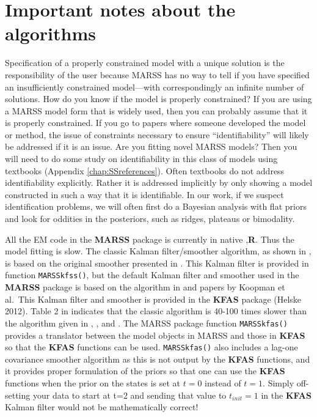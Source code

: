 \documentclass[12pt,]{book}
\begin{document}
\hypertarget{important-notes-about-the-algorithms}{%
\section{Important notes about the algorithms}\label{important-notes-about-the-algorithms}}

Specification of a properly constrained model with a unique solution is the responsibility of the user because MARSS has no way to tell if you have specified an insufficiently constrained model---with correspondingly an infinite number of solutions.
How do you know if the model is properly constrained? If you are using a MARSS model form that is widely used, then you can probably assume that it is properly constrained. If you go to papers where someone developed the model or method, the issue of constraints necessary to ensure ``identifiability'' will likely be addressed if it is an issue. Are you fitting novel MARSS models? Then you will need to do some study on identifiability in this class of models using textbooks (Appendix \ref{chap:SSreferences}). Often textbooks do not address identifiability explicitly. Rather it is addressed implicitly by only showing a model constructed in such a way that it is identifiable. In our work, if we suspect identification problems, we will often first do a Bayesian analysis with flat priors and look for oddities in the posteriors, such as ridges, plateaus or bimodality.

All the EM code in the \textbf{MARSS} package is currently in native ,\textbf{R}. Thus the model fitting is slow. The classic Kalman filter/smoother algorithm, as shown in \citet[p. 331-335]{ShumwayStoffer2006}, is based on the original smoother presented in \citet{Rauch1963}. This Kalman filter is provided in function \texttt{MARSSkfss()}, but the default Kalman filter and smoother used in the \textbf{MARSS} package is based on the algorithm in \citet{KohnAnsley1989} and papers by Koopman et al.~This Kalman filter and smoother is provided in the \textbf{KFAS} package (Helske 2012). Table 2 in \citet{Koopman1993} indicates that the classic algorithm is 40-100 times slower than the algorithm given in \citet{KohnAnsley1989}, \citet{Koopman1993}, and \citet{Koopmanetal1998}. The MARSS package function \texttt{MARSSkfas()} provides a translator between the model objects in MARSS and those in \textbf{KFAS} so that the \textbf{KFAS} functions can be used. \texttt{MARSSkfas()} also includes a lag-one covariance smoother algorithm as this is not output by the \textbf{KFAS} functions, and it provides proper formulation of the priors so that one can use the \textbf{KFAS} functions when the prior on the states is set at \(t=0\) instead of \(t=1\). Simply off-setting your data to start at t=2 and sending that value to \(t_{init}=1\) in the \textbf{KFAS} Kalman filter would not be mathematically correct!
\end{document}
